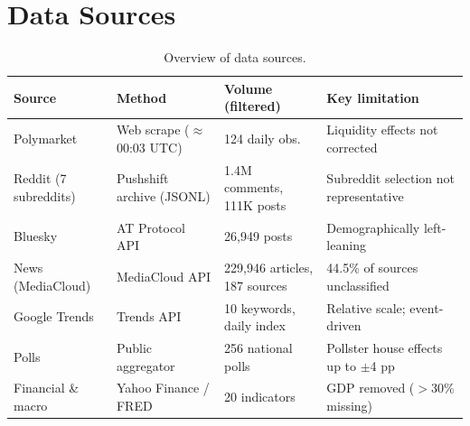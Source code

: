 \newpage
\section{Data Sources}
\label{app:datasources}

\begin{table}[ht]
\centering
\small
\begin{tabular}{p{2.8cm} p{3.8cm} p{3.2cm} p{4.0cm}}
\toprule
\textbf{Source} & \textbf{Method} & \textbf{Volume (filtered)} & \textbf{Key limitation} \\
\midrule
Polymarket            & Web scrape ($\approx$00:03 UTC)    & 124 daily obs.                & Liquidity effects not corrected \\
Reddit (7 subreddits) & Pushshift archive (JSONL)          & 1.4M comments, 111K posts     & Subreddit selection not representative \\
Bluesky               & AT Protocol API                    & 26,949 posts                  & Demographically left-leaning \\
News (MediaCloud)     & MediaCloud API                     & 229,946 articles, 187 sources & 44.5\% of sources unclassified \\
Google Trends         & Trends API                         & 10 keywords, daily index      & Relative scale; event-driven \\
Polls                 & Public aggregator                  & 256 national polls            & Pollster house effects up to $\pm$4 pp \\
Financial \& macro    & Yahoo Finance / FRED               & 20 indicators                 & GDP removed ($>$30\% missing) \\
\bottomrule
\end{tabular}
\caption{Overview of data sources.}
\label{tab:datasources}
\end{table}
